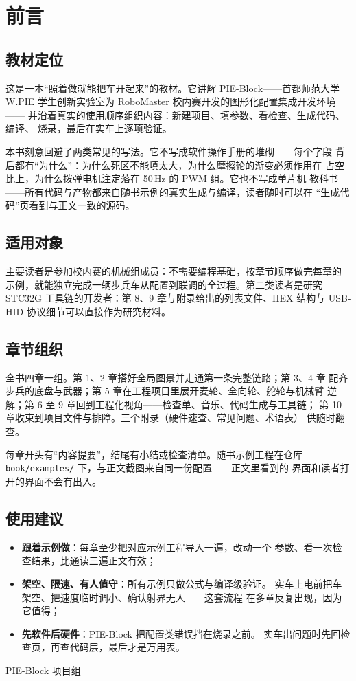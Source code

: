\chapter*{前言}

\section*{教材定位}

这是一本“照着做就能把车开起来”的教材。它讲解 PIE-Block——首都师范大学
W.PIE 学生创新实验室为 RoboMaster 校内赛开发的图形化配置集成开发环境——
并沿着真实的使用顺序组织内容：新建项目、填参数、看检查、生成代码、编译、
烧录，最后在实车上逐项验证。

本书刻意回避了两类常见的写法。它不写成软件操作手册的堆砌——每个字段
背后都有“为什么”：为什么死区不能填太大，为什么摩擦轮的渐变必须作用在
占空比上，为什么拨弹电机注定落在 50\,Hz 的 PWM 组。它也不写成单片机
教科书——所有代码与产物都来自随书示例的真实生成与编译，读者随时可以在
“生成代码”页看到与正文一致的源码。

\section*{适用对象}

主要读者是参加校内赛的机械组成员：不需要编程基础，按章节顺序做完每章的
示例，就能独立完成一辆步兵车从配置到联调的全过程。第二类读者是研究
STC32G 工具链的开发者：第 8、9 章与附录给出的列表文件、HEX 结构与
USB-HID 协议细节可以直接作为研究材料。

\section*{章节组织}

全书四章一组。第 1、2 章搭好全局图景并走通第一条完整链路；第 3、4 章
配齐步兵的底盘与武器；第 5 章在工程项目里展开麦轮、全向轮、舵轮与机械臂
逆解；第 6 至 9 章回到工程化视角——检查单、音乐、代码生成与工具链；
第 10 章收束到项目文件与排障。三个附录（硬件速查、常见问题、术语表）
供随时翻查。

每章开头有“内容提要”，结尾有小结或检查清单。随书示例工程在仓库
\texttt{book/examples/} 下，与正文截图来自同一份配置——正文里看到的
界面和读者打开的界面不会有出入。

\section*{使用建议}

\begin{itemize}
  \item \textbf{跟着示例做}：每章至少把对应示例工程导入一遍，改动一个
        参数、看一次检查结果，比通读三遍正文有效；
  \item \textbf{架空、限速、有人值守}：所有示例只做公式与编译级验证。
        实车上电前把车架空、把速度临时调小、确认射界无人——这套流程
        在多章反复出现，因为它值得；
  \item \textbf{先软件后硬件}：PIE-Block 把配置类错误挡在烧录之前。
        实车出问题时先回检查页，再查代码层，最后才是万用表。
\end{itemize}

\bigskip

\noindent PIE-Block 项目组
